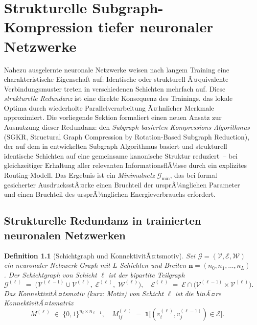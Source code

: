 ﻿\documentclass[12pt, a4paper, openany]{report}
\newtheorem{definition}[theorem]{Definition}
\newcommand{\calG}{\mathcal{G}}
\newcommand{\calV}{\mathcal{V}}
\newcommand{\calE}{\mathcal{E}}
\newcommand{\calW}{\mathcal{W}}
\begin{document}
\chapter{Strukturelle Subgraph-Kompression tiefer neuronaler Netzwerke}
\label{sec:subgraph_compression}

Nahezu ausgelernte neuronale Netzwerke weisen nach langem Training eine
charakteristische Eigenschaft auf: Identische oder strukturell Ã¤quivalente
Verbindungsmuster treten in verschiedenen Schichten mehrfach auf.  Diese
\emph{strukturelle Redundanz} ist eine direkte Konsequenz des Trainings,
das lokale Optima durch wiederholte Parallelverarbeitung Ã¤hnlicher Merkmale
approximiert.  Die vorliegende Sektion formaliert einen neuen Ansatz zur
Ausnutzung dieser Redundanz: den \emph{Subgraph-basierten
Kompressions-Algorithmus} (SGKR, Structural Graph Compression by
Rotation-Based Subgraph Reduction), der auf dem in \cite{epp2026subgraph} entwickelten
Subgraph Algorithmus basiert und strukturell identische Schichten auf eine
gemeinsame kanonische Struktur reduziert~-- bei gleichzeitiger Erhaltung
aller relevanten InformationsflÃ¼sse durch ein explizites Routing-Modell.
Das Ergebnis ist ein \emph{Minimal\-netz} $\calG_{\min}$, das bei
formal gesicherter AusdrucksstÃ¤rke einen Bruchteil der ursprÃ¼nglichen
Parameter und einen Bruchteil des ursprÃ¼nglichen Energieverbrauchs erfordert.

\section{Strukturelle Redundanz in trainierten neuronalen Netzwerken}
\label{sec:sgkr_motivation}

\begin{definition}[Schichtgraph und KonnektivitÃ¤tsmotiv]
\label{def:layer_motif}
Sei $\calG = (\calV, \calE, \calW)$ ein neuronaler Netzwerk-Graph mit
$L$ Schichten und Breiten $\bm{n} = (n_0, n_1, \ldots, n_L)$.  Der
\emph{Schichtgraph} von Schicht $\ell$ ist der bipartite Teilgraph
\[
  \calG^{(\ell)}
  \;=\;
  \bigl(\calV^{(\ell-1)} \cup \calV^{(\ell)},\;
        \calE^{(\ell)},\;
        \calW^{(\ell)}\bigr),
  \quad
  \calE^{(\ell)} \;=\; \calE \cap \bigl(\calV^{(\ell-1)} \times \calV^{(\ell)}\bigr).
\]
Das \emph{KonnektivitÃ¤tsmotiv} (kurz: \emph{Motiv}) von Schicht $\ell$ ist
die binÃ¤re KonnektivitÃ¤ts\-matrix
\[
  M^{(\ell)} \;\in\; \{0,1\}^{n_\ell \times n_{\ell-1}},
  \quad
  M^{(\ell)}_{ij} \;=\; \mathbf{1}\bigl[(v_i^{(\ell)}, v_j^{(\ell-1)}) \in \calE\bigr].
\]
\end{definition}
\end{document}
